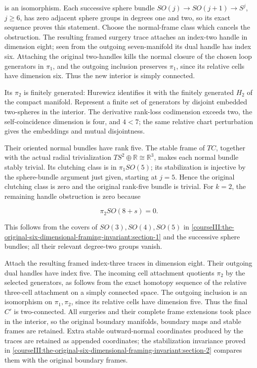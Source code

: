 is an isomorphism. Each successive sphere bundle \(SO(j)\to SO(j+1)\to S^j\), \(j\ge6\), has zero adjacent sphere groups in degrees one and two, so its exact sequence proves this statement. Choose the normal-frame class which cancels the obstruction. The resulting framed surgery trace attaches an index-two handle in dimension eight; seen from the outgoing seven-manifold its dual handle has index six. Attaching the original two-handles kills the normal closure of the chosen loop generators in \(\pi_1\), and the outgoing inclusion preserves \(\pi_1\), since its relative cells have dimension six. Thus the new interior is simply connected.

Its \(\pi_2\) is finitely generated: Hurewicz identifies it with the finitely generated \(H_2\) of the compact manifold. Represent a finite set of generators by disjoint embedded two-spheres in the interior. The derivative rank-loss codimension exceeds two, the self-coincidence dimension is four, and \(4<7\); the same relative chart perturbation gives the embeddings and mutual disjointness.

Their oriented normal bundles have rank five. The stable frame of \(TC\), together with the actual radial trivialization \(TS^2\oplus\mathbb R\cong\mathbb R^3\), makes each normal bundle stably trivial. Its clutching class is in \(\pi_1SO(5)\); its stabilization is injective by the sphere-bundle argument just given, starting at \(j=5\). Hence the original clutching class is zero and the original rank-five bundle is trivial. For \(k=2\), the remaining handle obstruction is zero because

\begin{equation}
\pi_2SO(8+s)=0.
 \label{courseIII:the-original-six-dimensional-framing-invariant:eq:8.9}
\end{equation}

This follows from the covers of \(SO(3),SO(4),SO(5)\) in \cref{courseIII:the-original-six-dimensional-framing-invariant:section-1} and the successive sphere bundles; all their relevant degree-two groups vanish.

Attach the resulting framed index-three traces in dimension eight. Their outgoing dual handles have index five. The incoming cell attachment quotients \(\pi_2\) by the selected generators, as follows from the exact homotopy sequence of the relative three-cell attachment on a simply connected space. The outgoing inclusion is an isomorphism on \(\pi_1,\pi_2\), since its relative cells have dimension five. Thus the final \(C'\) is two-connected. All surgeries and their complete frame extensions took place in the interior, so the original boundary manifolds, boundary maps and stable frames are retained. Extra stable outward-normal coordinates produced by the traces are retained as appended coordinates; the stabilization invariance proved in \cref{courseIII:the-original-six-dimensional-framing-invariant:section-2} compares them with the original boundary frames.

